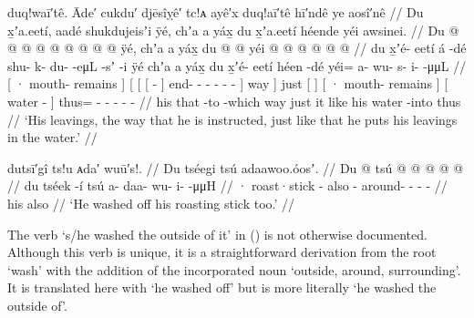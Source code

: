 \ex\label{ex:100-72-instructed-into-water}%
%
\begingl
	\glpreamble	duq!waī′tê.
Āde′ cukdu′ djēsîỵê′ tc!ᴀ ayê′x duq!aī′tê hī′ndê ye aosî′nê //
	\glpreamble	Du x̱ʼa.eetí, aadé shukdujeisʼi ÿé, chʼa a yáx̱ du x̱ʼa.eetí héende yéi awsinei. //
	\gla	{} Du  @ {} {}
		{} {} {}  @ {} {}  @ {} @ {} @ {} @ {} @ {} @ {} @ {} ÿé, {}
		chʼa {} a yáx̱ {}
		{} du  @ {} {} 
		{}  @ {} {}
		yéi @  @ {} @ {} @ {} @ {} @ {} //
	\glb	{} du x̱ʼé- eetí {}
		{} {} {} á -dé {} shu- k- du-  -eμL -sʼ -i {} ÿé {}
		chʼa {} a yáx̱ {}
		{} du x̱ʼé- eetí {}
		{} héen -dé {}
		yéi= a- wu- s- i-  -μμL //
	\glc	{}[ · mouth- remains {}]
		{}[ {}[ {}[  - {}]
			end- - -  - - - {}] way {}]
		just {}[   {}]
		{}[ · mouth- remains {}]
		{}[ water - {}]
		thus= - - - -  - //
	\gld	{} his  {} {}
		{} {} {} that -to {}
			 {} {} {} {} {} -which {} way {}
		just {} it like {}
		{} his  {} {} 
		{} water -into {} 
		thus  {} {} {} {} {} //
	\glft	‘His leavings, the way that he is instructed, just like that he puts his leavings in the water.’
		//
\endgl
\xe

\ex\label{ex:100-73-wash-off-stick}%
%
\begingl
	\glpreamble	dutsī′gî ts!u ᴀda′ wuū′s!. //
	\glpreamble	Du tséegi tsú adaawoo.óosʼ. //
	\gla	{} Du  @ {} {} tsú
		 @ {} @ {} @ {} @ {} @ {} //
	\glb	{} du tséek -í {} tsú
		a- daa- wu- i-  -μμH //
	\glc	{} · roast·stick - {} also
		- around- - -  - //
	\gld	{} his  {} {} also
		 {} {} {} {} {} //
	\glft	‘He washed off his roasting stick too.’
		//
\endgl
\xe

The verb  ‘s/he washed the outside of it’ in (\lastx) is not otherwise documented.
Although this verb is unique, it is a straightforward derivation from the root  ‘wash’ with the addition of the incorporated noun  ‘outside, around, surrounding’.
It is translated here with ‘he washed off’ but is more literally ‘he washed the outside of’.

